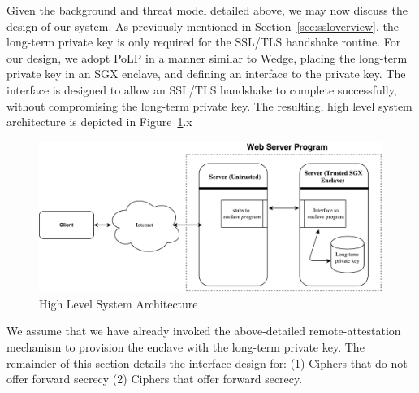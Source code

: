 \documentclass[../../main.tex]{subfiles}
\begin{document}
Given the background and threat model detailed above, we may now
discuss the design of our system. As previously mentioned in
Section~\ref{sec:ssloverview}, the long-term private key is only
required for the SSL/TLS handshake routine. For our design, we adopt
PoLP in a manner similar to Wedge, placing the long-term private key
in an SGX enclave, and defining an interface to the private key. The
interface is designed to allow an SSL/TLS handshake to complete
successfully, without compromising the long-term private key. The
resulting, high level system architecture is depicted in
Figure~\ref{fig:sysarch}.x

\begin{figure}[H]
  \centering
  \includegraphics[scale=0.4]{images/high-level-arch.pdf}
  \caption{High Level System Architecture}
  \label{fig:sysarch}
\end{figure}

We assume that we have already invoked the above-detailed
remote-attestation mechanism to provision the enclave with the
long-term private key. The remainder of this section details the
interface design for: (1) Ciphers that do not offer forward secrecy
(2) Ciphers that offer forward secrecy.


\end{document}
